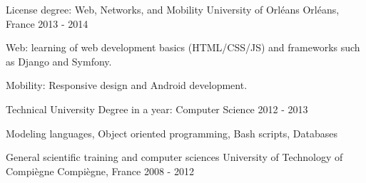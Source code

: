 \begin{cventries}
  \cventry
    {License degree: Web, Networks, and Mobility}
    {University of Orléans}
    {Orléans, France}
    {2013 - 2014}
    {
      \begin{cvitems}
        \item {Web: learning of web development basics (HTML/CSS/JS) and frameworks such as Django and Symfony.}
        \item {Mobility: Responsive design and Android development.}
      \end{cvitems}
      \vspace{-2.0mm}
    }
  \cventry
    {Technical University Degree in a year: Computer Science}
    {}
    {}
    {2012 - 2013}
    {
      \begin{cvitems}
        \item {Modeling languages, Object oriented programming, Bash scripts, Databases}
      \end{cvitems}
    }
  \cventry
    {General scientific training and computer sciences}
    {University of Technology of Compiègne}
    {Compiègne, France}
    {2008 - 2012}
    {}
\end{cventries}
